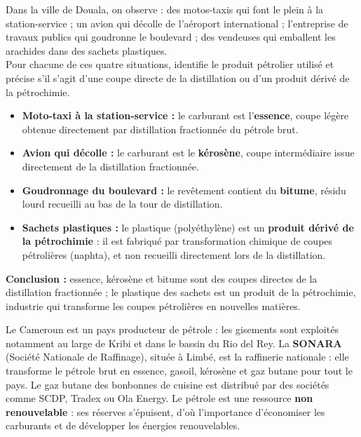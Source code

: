 \documentclass[11pt]{article}
\begin{document}
\begin{exoresolu}
Dans la ville de Douala, on observe : des motos-taxis qui font le plein à la station-service ; un avion qui décolle de l'aéroport international ; l'entreprise de travaux publics qui goudronne le boulevard ; des vendeuses qui emballent les arachides dans des sachets plastiques. \\
Pour chacune de ces quatre situations, identifie le produit pétrolier utilisé et précise s'il s'agit d'une coupe directe de la distillation ou d'un produit dérivé de la pétrochimie.
\tcblower
\begin{itemize}
\item \textbf{Moto-taxi à la station-service :} le carburant est l'\textbf{essence}, coupe légère obtenue directement par distillation fractionnée du pétrole brut.
\item \textbf{Avion qui décolle :} le carburant est le \textbf{kérosène}, coupe intermédiaire issue directement de la distillation fractionnée.
\item \textbf{Goudronnage du boulevard :} le revêtement contient du \textbf{bitume}, résidu lourd recueilli au bas de la tour de distillation.
\item \textbf{Sachets plastiques :} le plastique (polyéthylène) est un \textbf{produit dérivé de la pétrochimie} : il est fabriqué par transformation chimique de coupes pétrolières (naphta), et non recueilli directement lors de la distillation.
\end{itemize}
\textbf{Conclusion :} essence, kérosène et bitume sont des coupes directes de la distillation fractionnée ; le plastique des sachets est un produit de la pétrochimie, industrie qui transforme les coupes pétrolières en nouvelles matières.
\end{exoresolu}

\begin{savaistu}
Le Cameroun est un pays producteur de pétrole : les gisements sont exploités notamment au large de Kribi et dans le bassin du Rio del Rey. La \textbf{SONARA} (Société Nationale de Raffinage), située à Limbé, est la raffinerie nationale : elle transforme le pétrole brut en essence, gasoil, kérosène et gaz butane pour tout le pays. Le gaz butane des bonbonnes de cuisine est distribué par des sociétés comme SCDP, Tradex ou Ola Energy. Le pétrole est une ressource \textbf{non renouvelable} : ses réserves s'épuisent, d'où l'importance d'économiser les carburants et de développer les énergies renouvelables.
\end{savaistu}
\end{document}
